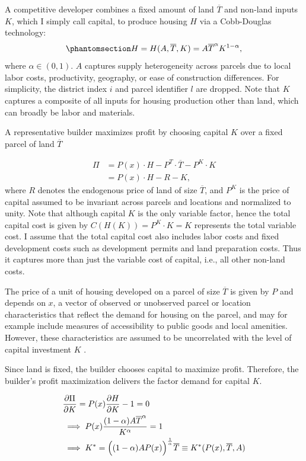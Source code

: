 \documentclass[
  12pt,
]{article}
\begin{document}
A competitive developer combines a fixed amount of land \(\overline{T}\)
and non-land inputs \(K\), which I simply call capital, to produce
housing \(H\) via a Cobb-Douglas technology:
\begin{equation}\protect\phantomsection\label{eq-cobb-appendix}{
H = H(A, \overline{T}, K) = A \overline{T}^{\alpha} K^{1-\alpha},
}\end{equation} where \(\alpha \in (0, 1)\). \(A\) captures supply
heterogeneity across parcels due to local labor costs, productivity,
geography, or ease of construction differences. For simplicity, the
district index \(i\) and parcel identifier \(l\) are dropped. Note that
\(K\) captures a composite of all inputs for housing production other
than land, which can broadly be labor and materials.

A representative builder maximizes profit by choosing capital \(K\) over
a fixed parcel of land \(\overline{T}\)

\[
\begin{aligned}
\Pi &= P(x) \cdot H - P^T \cdot \overline{T} - P^K\cdot K\\
&=P(x)\cdot H - R - K,
\end{aligned}
\] where \(R\) denotes the endogenous price of land of size
\(\overline{T}\), and \(P^K\) is the price of capital assumed to be
invariant across parcels and locations and normalized to unity. Note
that although capital \(K\) is the only variable factor, hence the total
capital cost is given by \(C(H(K)) = P^K\cdot K = K\) represents the
total variable cost. I assume that the total capital cost also includes
labor costs and fixed development costs such as development permits and
land preparation costs. Thus it captures more than just the variable
cost of capital, i.e., all other non-land costs.

The price of a unit of housing developed on a parcel of size
\(\overline{T}\) is given by \(P\) and depends on \(x\), a vector of
observed or unobserved parcel or location characteristics that reflect
the demand for housing on the parcel, and may for example include
measures of accessibility to public goods and local amenities. However,
these characteristics are assumed to be uncorrelated with the level of
capital investment \(K\) \citep{combes_etal_2021}.

Since land is fixed, the builder chooses capital to maximize profit.
Therefore, the builder's profit maximization delivers the factor demand
for capital \(K\).

\[
\begin{aligned}
&\frac{\partial \Pi}{\partial K} = P(x) \frac{\partial H}{\partial K} - 1 = 0\\
&\implies P(x) \frac{(1-\alpha) A \overline{T}^\alpha}{K^\alpha} = 1 \\
&\implies K^* = \Bigl((1-\alpha)AP(x)\Bigr)^{\frac{1}{\alpha}}\overline{T}\equiv K^*(P(x), \overline{T}, A)
\end{aligned}
\]
\end{document}
